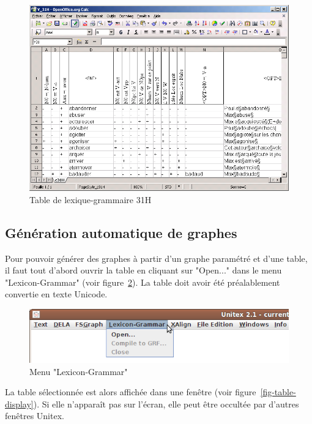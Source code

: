 \begin{figure}[!h]
\begin{center}
\includegraphics[width=15cm]{resources/img/fig8-4.png}
\caption{Table de lexique-grammaire 31H\label{fig-table-31H}}
\end{center}
\end{figure}


\subsection{Génération automatique de graphes}
Pour pouvoir générer des graphes à partir d’un graphe paramétré et d’une table, il faut
tout d’abord ouvrir la table en cliquant sur "Open..." dans le menu "Lexicon-Grammar" (voir
figure~\ref{fig-lexicon-grammar-menu}). La table doit avoir été préalablement convertie en texte
Unicode.

\begin{figure}[!h]
\begin{center}
\includegraphics[width=12cm]{resources/img/fig8-5.png}
\caption{Menu "Lexicon-Grammar"\label{fig-lexicon-grammar-menu}}
\end{center}
\end{figure}

\bigskip
\noindent La table sélectionnée est alors affichée dans une fenêtre (voir
figure~\ref{fig-table-display}). Si elle n'apparaît pas sur l'écran, elle peut être occultée par
d'autres fenêtres Unitex.

